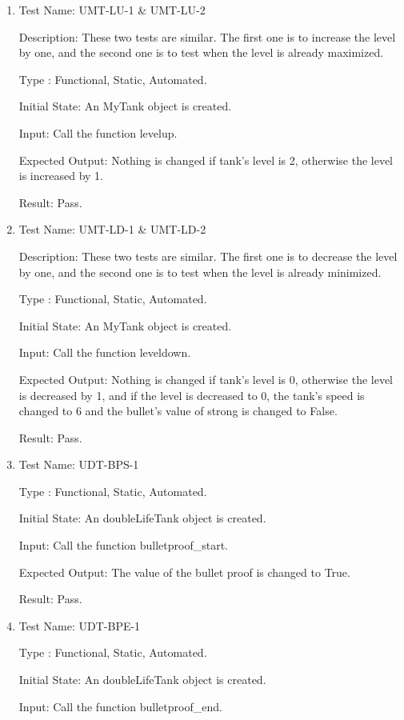 \documentclass[12pt, titlepage]{article}
\begin{document}
\begin{enumerate}
\item{Test Name: UMT-LU-1 \& UMT-LU-2}

Description: These two tests are similar. The first one is to increase the level by one, and the second
one is to test when the level is already maximized.

Type : Functional, Static, Automated.

Initial State: An MyTank object is created.

Input: Call the function levelup.

Expected Output: Nothing is changed if tank's level is 2, otherwise the level is increased by 1.

Result: Pass.\\

\item{Test Name: UMT-LD-1 \& UMT-LD-2}

Description: These two tests are similar. The first one is to decrease the level by one, and the second
one is to test when the level is already minimized.

Type : Functional, Static, Automated.

Initial State: An MyTank object is created.

Input: Call the function leveldown.

Expected Output: Nothing is changed if tank's level is 0, otherwise the level is decreased by 1, and if
the level is decreased to 0, the tank's speed is changed to 6 and the bullet's value of strong is changed to False.

Result: Pass.\\

\item{Test Name: UDT-BPS-1}

Type : Functional, Static, Automated.

Initial State: An doubleLifeTank object is created.

Input: Call the function bulletproof\_start.

Expected Output: The value of the bullet proof is changed to True.

Result: Pass.\\

\item{Test Name: UDT-BPE-1}

Type : Functional, Static, Automated.

Initial State: An doubleLifeTank object is created.

Input: Call the function bulletproof\_end.


\end{enumerate}
\end{document}
